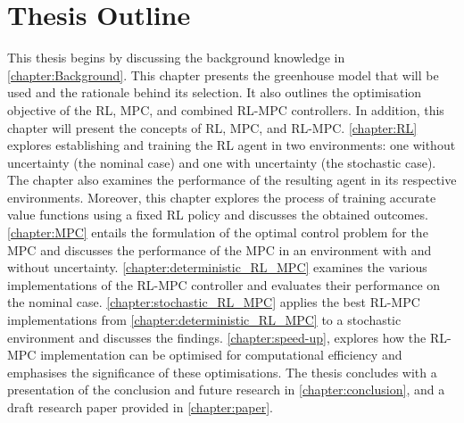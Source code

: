 \section{Thesis Outline}
This thesis begins by discussing the background knowledge in \cref{chapter:Background}.  This chapter presents the greenhouse model that will be used and the rationale behind its selection. It also outlines the optimisation objective of the RL, MPC, and combined RL-MPC controllers. In addition, this chapter will present the concepts of RL, MPC, and RL-MPC. \cref{chapter:RL} explores establishing and training the RL agent in two environments: one without uncertainty (the nominal case) and one with uncertainty (the stochastic case). The chapter also examines the performance of the resulting agent in its respective environments. Moreover, this chapter explores the process of training accurate value functions using a fixed RL policy and discusses the obtained outcomes. \cref{chapter:MPC} entails the formulation of the optimal control problem for the MPC and discusses the performance of the MPC in an environment with and without uncertainty. \cref{chapter:deterministic_RL_MPC} examines the various implementations of the RL-MPC controller and evaluates their performance on the nominal case. \cref{chapter:stochastic_RL_MPC} applies the best RL-MPC implementations from \cref{chapter:deterministic_RL_MPC} to a stochastic environment and discusses the findings. \cref{chapter:speed-up}, explores how the RL-MPC implementation can be optimised for computational efficiency and emphasises the significance of these optimisations. The thesis concludes with a presentation of the conclusion and future research in \cref{chapter:conclusion}, and a draft research paper provided in \cref{chapter:paper}.

